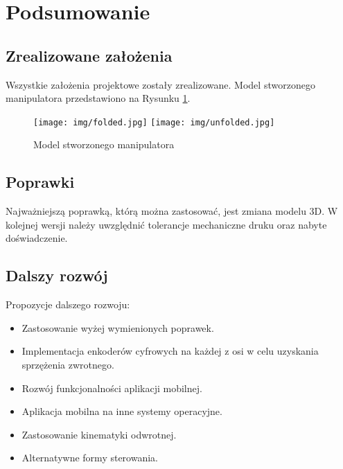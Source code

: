 \documentclass[11pt,titlepage]{article}
\begin{document}
\vspace{\fill}

\newpage

\section{Podsumowanie}

\subsection{Zrealizowane założenia}

Wszystkie założenia projektowe zostały zrealizowane. Model stworzonego manipulatora przedstawiono na Rysunku \ref{manipulator}.

\begin{figure}[h!]
    \begin{center}
        \texttt{[image: img/folded.jpg]}
        \texttt{[image: img/unfolded.jpg]}
    \end{center}
    \caption{Model stworzonego manipulatora}
    \label{manipulator}
\end{figure}

\subsection{Poprawki}

Najważniejszą poprawką, którą można zastosować, jest zmiana modelu 3D. W kolejnej wersji należy uwzględnić tolerancje mechaniczne druku oraz nabyte doświadczenie.

\subsection{Dalszy rozwój}

Propozycje dalszego rozwoju:
\begin{itemize}
    \item Zastosowanie wyżej wymienionych poprawek.
    \item Implementacja enkoderów cyfrowych na każdej z osi w celu uzyskania sprzężenia zwrotnego.
    \item Rozwój funkcjonalności aplikacji mobilnej.
    \item Aplikacja mobilna na inne systemy operacyjne.
    \item Zastosowanie kinematyki odwrotnej.
    \item Alternatywne formy sterowania.
\end{itemize}
\end{document}
